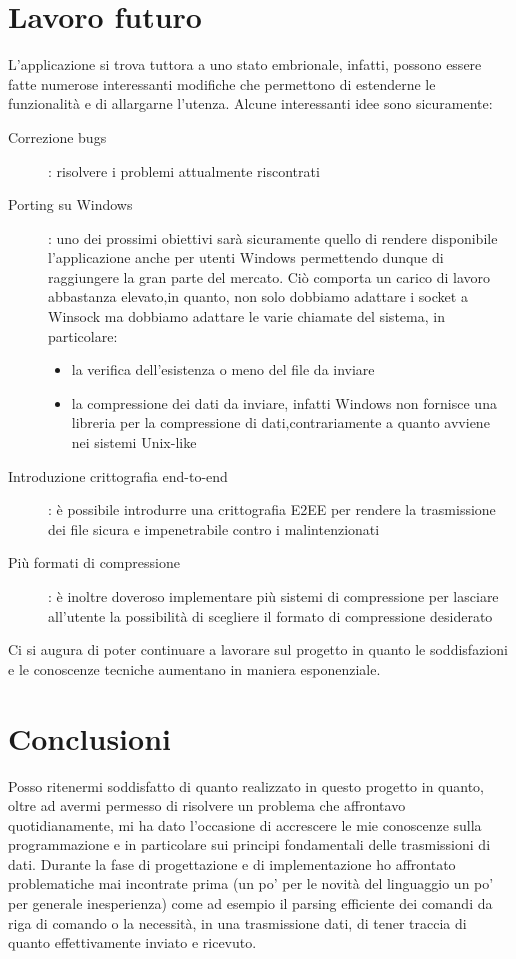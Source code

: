 \documentclass[11pt,fleqn]{book} %
\begin{document}
\section{Lavoro futuro}
L'applicazione si trova tuttora a uno stato embrionale, infatti, possono essere fatte numerose interessanti modifiche che permettono di estenderne le funzionalità e di allargarne l'utenza. 
Alcune interessanti idee sono sicuramente:
\begin{description}
	\item[Correzione bugs]: risolvere i problemi attualmente riscontrati
	\item[Porting su Windows]: uno dei prossimi obiettivi sarà sicuramente quello di rendere disponibile l'applicazione anche per utenti Windows 			permettendo dunque di raggiungere la gran parte del mercato. Ciò comporta un carico di lavoro abbastanza elevato,in quanto, non solo dobbiamo 			adattare i socket a Winsock ma dobbiamo adattare le varie chiamate del sistema, in particolare:
			\begin{itemize}
				\item la verifica dell'esistenza o meno del file da inviare
				\item la compressione dei dati da inviare, infatti Windows non fornisce una libreria  per la compressione di dati,contrariamente a 					quanto avviene nei sistemi Unix-like
			\end{itemize}
	\item[Introduzione crittografia end-to-end]: è possibile introdurre una crittografia E2EE per rendere la trasmissione dei file sicura e 				impenetrabile contro i malintenzionati
	\item[Più formati di compressione]: è inoltre doveroso implementare più sistemi di compressione per lasciare all'utente la possibilità di 				scegliere il formato di compressione desiderato
\end{description}

Ci si augura di poter continuare a lavorare sul progetto in quanto le soddisfazioni e le conoscenze tecniche aumentano in maniera esponenziale.


\section{Conclusioni}
Posso ritenermi soddisfatto di quanto realizzato in questo progetto in quanto, oltre ad avermi permesso di risolvere un problema che affrontavo quotidianamente, mi ha dato l'occasione di accrescere le mie conoscenze sulla programmazione e in particolare sui principi fondamentali delle trasmissioni di dati.
Durante la fase di progettazione e di implementazione ho affrontato problematiche mai incontrate  prima (un po' per le novità del linguaggio un po' per generale inesperienza) come ad esempio il parsing efficiente dei comandi da riga di comando o la necessità, in una trasmissione dati, di tener traccia di quanto effettivamente inviato e ricevuto.
\end{document}
